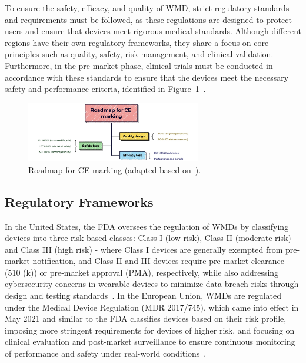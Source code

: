 \documentclass[journal]{IEEEtran}
\begin{document}
To ensure the safety, efficacy, and quality of WMD, strict regulatory standards and requirements must be followed, as these regulations are designed to protect users and ensure that devices meet rigorous medical standards. Although different regions have their own regulatory frameworks, they share a focus on core principles such as quality, safety, risk management, and clinical validation. Furthermore, in the pre-market phase, clinical trials must be conducted in accordance with these standards to ensure that the devices meet the necessary safety and performance criteria, identified in Figure~\ref{fig:roadmap}~\cite{Dias2018,Ravizza2019,EuropeanUnion2024}.

\begin{figure}[ht]
\centering
\includegraphics[width=3in]{Figuras/Roadmap for CE marking.jpeg}
\caption{Roadmap for CE marking (adapted based on~\cite{Ravizza2019}).}
\label{fig:roadmap}
\end{figure}

    \subsection{Regulatory Frameworks}


    In the United States, the FDA oversees the regulation of WMDs by classifying devices into three risk-based classes: Class I (low risk), Class II (moderate risk) and Class III (high risk) - where Class I devices are generally exempted from pre-market notification, and Class II and III devices require pre-market clearance (510 (k)) or pre-market approval (PMA), respectively, while also addressing cybersecurity concerns in wearable devices to minimize data breach risks through design and testing standards~\cite{Dias2018,Ravizza2019,FDA2016,FDA2023}. In the European Union, WMDs are regulated under the Medical Device Regulation (MDR 2017/745), which came into effect in May 2021 and similar to the FDA classifies devices based on their risk profile, imposing more stringent requirements for devices of higher risk, and focusing on clinical evaluation and post-market surveillance to ensure continuous monitoring of performance and safety under real-world conditions~\cite{EuropeanUnion2024}.
\end{document}

